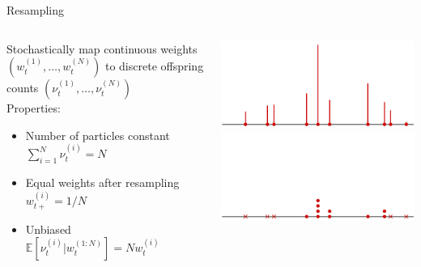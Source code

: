 \documentclass[aspectratio=169]{beamer}
\theoremstyle{definition}
\newcommand{\E}{\mathbb{E}}
\newcommand{\vt}[2][t]{\nu_{#1}^{(#2)}}
\newcommand{\wt}[2][t]{w_{#1}^{(#2)}}
\begin{document}
\begin{frame}{Resampling}
\begin{columns}
\begin{column}{0.45\textwidth}
Stochastically map continuous weights $(\wt{1}, \dots, \wt{N})$ to discrete offspring counts $(\vt{1},\dots, \vt{N})$\\[10pt]
Properties:
\begin{itemize}
\item Number of particles constant $\sum_{i=1}^N \vt{i} =N$
\item Equal weights after resampling $w_{t+}^{(i)} = 1/N$
\item Unbiased\\ $\E[\vt{i} | \wt{1:N}] = N\wt{i}$
\end{itemize}

\end{column}
\begin{column}{0.45\textwidth}
\centering
{}
\includegraphics[width=\textwidth]{resample1.pdf} \\
\includegraphics[width=\textwidth]{resample2.pdf}
\end{column}
\end{columns}
\end{frame}
\end{document}
